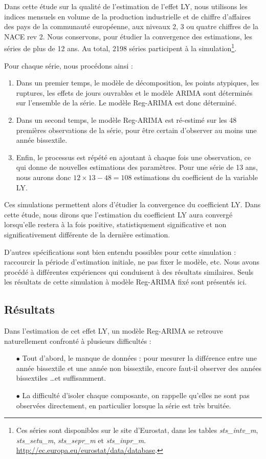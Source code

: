 \documentclass[12pt, a4paper, french]{article}
\begin{document}
Dans cette étude sur la qualité de l'estimation de l'effet LY, nous utilisons les indices mensuels en volume de la production industrielle et de chiffre d'affaires des pays de la communauté européenne, aux niveaux 2, 3 ou quatre chiffres de la NACE rev 2. Nous conservons, pour étudier la convergence des estimations, les séries de plus de 12 ans. Au total, 2198 séries participent à la simulation\footnote{Ces séries sont disponibles sur le site d'Eurostat, dans les tables \emph{sts\_intv\_m}, \emph{sts\_setu\_m}, \emph{sts\_sepr\_m} et \emph{sts\_inpr\_m}. \url{http://ec.europa.eu/eurostat/data/database}.}.

Pour chaque série, nous procédons ainsi :
\begin{enumerate}
	\item Dans un premier temps, le modèle de décomposition, les points atypiques, les ruptures, les effets de jours ouvrables et le modèle ARIMA sont déterminés sur l'ensemble de la série. Le modèle Reg-ARIMA est donc déterminé.
	\item Dans un second temps, le modèle Reg-ARIMA est ré-estimé sur les 48 premières observations de la série, pour être certain d'observer au moins une année bissextile.
	\item Enfin, le processus est répété en ajoutant à chaque fois une observation, ce qui donne de nouvelles estimations des paramètres. Pour une série de 13 ans, nous aurons donc $12\times13 - 48 = 108$ estimations du coefficient de la variable LY.
\end{enumerate}
Ces simulations permettent alors d'étudier la convergence du coefficient LY. Dans cette étude, nous dirons que l'estimation du coefficient LY aura convergé lorsqu'elle restera à la fois positive, statistiquement significative et non significativement différente de la dernière estimation.

D'autres spécifications sont bien entendu possibles pour cette simulation : raccourcir la période d'estimation initiale, ne pas fixer le modèle, etc. Nous avons procédé à différentes expériences qui conduisent à des résultats similaires. Seuls les résultats de cette simulation à modèle Reg-ARIMA fixé sont présentés ici.

\subsection{Résultats}

Dans l'estimation de cet effet LY, un modèle Reg-ARIMA se retrouve naturellement confronté à plusieurs difficultés :
\begin{itemize}
	\item[$\bullet$] Tout d'abord, le manque de données : pour mesurer la différence entre une année bissextile et une année non bissextile, encore faut-il observer des années bissextiles \dots et suffisamment.
	\item[$\bullet$] La difficulté d'isoler chaque composante, on rappelle qu'elles ne sont pas observées directement, en particulier lorsque la série est très bruitée.
\end{itemize}
\end{document}
